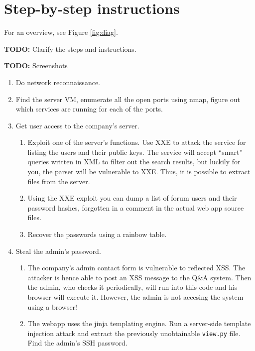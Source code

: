 \documentclass[a4paper]{article}
\newcommand{\TODO}[1]{\begin{center}\large\textbf{TODO:} #1\end{center}}
\begin{document}
\section{Step-by-step instructions}

For an overview, see Figure \ref{fig:diag}.

\TODO{Clarify the steps and instructions.}
\TODO{Screenshots}

\begin{enumerate}
  \item Do network reconnaissance.
  \item Find the server VM, enumerate all the open ports using nmap, figure
        out which services are running for each of the ports.
  \item Get user access to the company's server.
        \begin{enumerate}
          \item Exploit one of the server's functions.
              Use XXE to attack the service for listing the users and their public keys.
                The service will accept ``smart'' queries written in XML to filter out
                the search results, but luckily for you, the parser will be
                vulnerable to XXE. Thus, it is possible to extract files
                from the server.
          \item Using the XXE exploit you can dump a list of
                forum users and their password hashes, forgotten in a comment
                in the actual web app source files.
          \item Recover the passwords using a rainbow table.
        \end{enumerate}

  \item Steal the admin's password.
        \begin{enumerate}
          \item The company's admin contact form is vulnerable to reflected XSS. The attacker is
              hence able to post an XSS message to the Q\&A system. Then the admin, who
                checks it periodically, will run into this code and his browser
                will execute it. However, the admin is not accesing the system using a browser!
          \item The webapp uses the jinja templating engine. Run a server-side template
              injection attack and extract the previously unobtainable \texttt{view.py} file.
              Find the admin's SSH password.
        \end{enumerate}


\end{enumerate}
\end{document}
